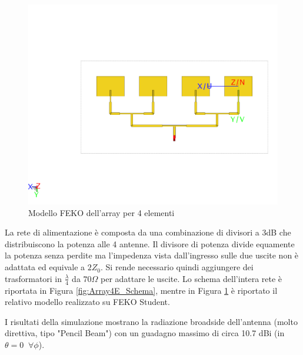 \documentclass[twoside,twocolumn]{article}
\begin{document}
\begin{figure}[h!]
  \includegraphics[width=\linewidth]{Array4E_Cad.png}
  \caption{Modello FEKO dell'array per 4 elementi}
  \label{fig:Array4E_Cad}
\end{figure}

La rete di alimentazione è composta da una combinazione di divisori a 3dB che distribuiscono la potenza alle 4 antenne.
Il divisore di potenza divide equamente la potenza senza perdite ma l'impedenza vista dall'ingresso sulle due uscite non è adattata ed equivale a $2Z_{0}$.
Si rende necessario quindi aggiungere dei trasformatori in $\frac{\lambda}{4}$ da $70 \Omega$ per adattare le uscite.
\newline
Lo schema dell'intera rete è riportata in Figura \ref{fig:Array4E_Schema}, mentre in Figura \ref{fig:Array4E_Cad} è riportato il relativo modello  realizzato su FEKO Student.



I risultati della simulazione mostrano la radiazione broadside  dell'antenna (molto direttiva, tipo "Pencil Beam") con un guadagno massimo di circa 10.7 dBi  (in $\theta =0 \;\; \forall \phi$).
\end{document}
